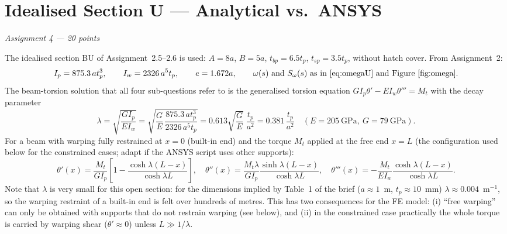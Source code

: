 \chapter{Idealised Section U --- Analytical vs.\ ANSYS}
\label{ch:assignment4}

\begingroup\itshape Assignment 4 --- 20 points\endgroup

\bigskip
\noindent{}

\bigskip
The idealised section BU of Assignment~2.5--2.6 is used: $A=8a$, $B=5a$, $t_{bp}=6.5t_p$, $t_{sp}=3.5t_p$, without hatch cover. From Assignment~2:
\begin{equation}
  I_p=875.3\,at_p^3,\qquad I_w=2326\,a^5t_p,\qquad e=1.672a,\qquad
  \omega(s)\ \text{and}\ S_\omega(s)\ \text{as in \eqref{eq:omegaU} and Figure~\ref{fig:omega}}.
\end{equation}
The beam-torsion solution that all four sub-questions refer to is the generalised torsion equation $GI_p\theta'-EI_w\theta'''=M_t$ with the decay parameter
\begin{equation}
  \lambda=\sqrt{\frac{GI_p}{EI_w}}=\sqrt{\frac{G}{E}\,\frac{875.3\,at_p^3}{2326\,a^5t_p}}=0.613\sqrt{\frac{G}{E}}\;\frac{t_p}{a^2}=0.381\,\frac{t_p}{a^2}\quad(E=205\ \mathrm{GPa},\ G=79\ \mathrm{GPa}).
\end{equation}
For a beam with warping fully restrained at $x=0$ (built-in end) and the torque $M_t$ applied at the free end $x=L$ (the configuration used below for the constrained cases; adapt if the ANSYS script uses other supports):
\begin{equation}
  \theta'(x)=\frac{M_t}{GI_p}\left[1-\frac{\cosh\lambda(L-x)}{\cosh\lambda L}\right],\quad
  \theta''(x)=\frac{M_t\lambda}{GI_p}\frac{\sinh\lambda(L-x)}{\cosh\lambda L},\quad
  \theta'''(x)=-\frac{M_t}{EI_w}\frac{\cosh\lambda(L-x)}{\cosh\lambda L}.
  \label{eq:cantilever}
\end{equation}
Note that $\lambda$ is very small for this open section: for the dimensions implied by Table~1 of the brief ($a\approx1$~m, $t_p\approx10$~mm) $\lambda\approx0.004$~m$^{-1}$, so the warping restraint of a built-in end is felt over hundreds of metres. This has two consequences for the FE model: (i) ``free warping'' can only be obtained with supports that do not restrain warping (see below), and (ii) in the constrained case practically the whole torque is carried by warping shear ($\theta'\approx0$) unless $L\gg1/\lambda$.

